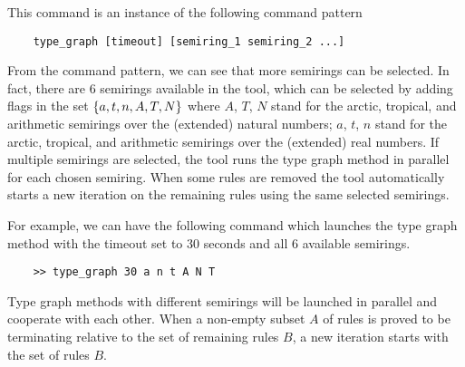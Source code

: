 This command is an instance of the following command pattern
\begin{verbatim}
    type_graph [timeout] [semiring_1 semiring_2 ...]
\end{verbatim}
From the command pattern, we can see that more semirings can be selected. In fact, there are 6 semirings available in the tool, which can be selected by adding flags in the set $\{a,t,n,A,T,N\}$ where $A$, $T$, $N$ stand for the arctic, tropical, and arithmetic semirings over the (extended) natural numbers;  $a$, $t$, $n$ stand for the arctic, tropical, and arithmetic semirings over the (extended) real numbers. If multiple semirings are selected, the tool runs the type graph method in parallel for each chosen semiring. When some rules are removed the tool automatically starts a new iteration on the remaining rules using the same selected semirings. 

For example, we can have the following command which launches the type graph method with the timeout set to 30 seconds and all 6 available semirings.
\begin{verbatim} 
    >> type_graph 30 a n t A N T
\end{verbatim}
Type graph methods with different semirings will be launched in parallel and cooperate with each other. When a non-empty subset $A$ of rules is proved to be terminating relative to the set of remaining rules $B$, a new iteration starts with the set of rules $B$.


